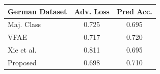 
\begin{figure}[t]
\begin{center}
\centering
\begin{subfigure}[t]{0.5\textwidth}
\vspace{-4.75cm}
    \begin{tabular}{|p{2.25cm}|c|c|}\hline
         German Dataset& Adv. Loss & Pred Acc. \\\hline
          Maj. Class & 0.725 & 0.695 \\\hline
          VFAE \cite{louizos2015variational} & 0.717 & 0.720 \\\hline
          Xie et al. \cite{xie2017controllable} & 0.811 & 0.695 \\\hline
          Proposed & 0.698 & 0.710 \\\hline
    \end{tabular}
\vspace{0.25cm}


\end{subfigure}
\end{center}
\end{figure}

